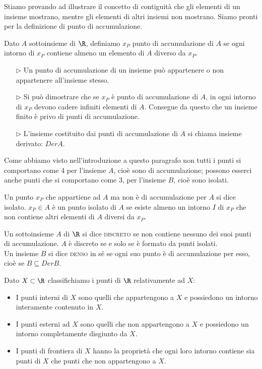 Stiamo provando ad illustrare il concetto di contiguità che gli elementi di 
un insieme mostrano, mentre gli elementi di altri insiemi non mostrano. Siamo 
pronti per la definizione di punto di accumulazione.

\begin{definizione}
Dato \(A\) sottoinsieme di \(\R\), definiamo \(x_P\) punto di 
accumulazione di \(A\) se ogni intorno di \(x_P\) contiene almeno un elemento 
di 
\(A\) diverso da \(x_P\).
\begin{itemize}
\item[\(\rhd\)] Un punto di accumulazione di un insieme può appartenere 
o non appartenere all'insieme stesso.
\item[\(\rhd\)]   Si può dimostrare che se \(x_P\) è punto di 
accumulazione di \(A\), in ogni intorno di \(x_P\) devono cadere infiniti 
elementi di \(A\). Consegue da questo che un insieme finito è privo di punti di 
accumulazione.
\item[\(\rhd\)] L'insieme costituito dai punti di accumulazione di \(A\) 
si chiama insieme derivato: \(Der A\).
\end{itemize}
\end{definizione}

Come abbiamo visto nell'introduzione a questo paragrafo non tutti i punti si 
comportano come 4 per l'insieme \(A\), cioè sono di accumulazione; possono 
esserci anche punti che si comportano come 3, per l'insieme \(B\), cioè sono 
isolati.

\begin{definizione}
Un punto \(x_P\) che appartiene ad \(A\) ma non è di accumulazione per \(A\) 
si dice isolato. \(x_P\in A\) è un punto isolato di \(A\) se esiste almeno un 
intorno \(I\) di \(x_P\) che non contiene altri elementi di \(A\) diversi da 
\(x_P\).
\end{definizione}

Un sottoinsieme \(A\) di \(\R\) si dice \textsc{discreto} se non contiene 
nessuno dei suoi punti di accumulazione. \(A\) è discreto se e solo se è 
formato da punti isolati.\\
Un insieme \(B\) si dice \textsc{denso} in sé se ogni suo punto è di 
accumulazione per esso, cioè se \(B\subseteq Der B\).

Dato \(X\subset \R\) classifichiamo i punti di \(\R\) 
relativamente ad \(X\):
\begin{itemize}
\item I punti interni di \(X\) sono quelli che appartengono a \(X\) e 
possiedono un intorno interamente contenuto in \(X\).
\item   I punti esterni ad \(X\) sono quelli che non appartengono a \(X\) 
e possiedono un intorno completamente disgiunto da \(X\).
\item   I punti di frontiera di \(X\) hanno la proprietà che ogni loro 
intorno contiene sia punti di \(X\) che punti che non appartengono a \(X\).
\end{itemize}

